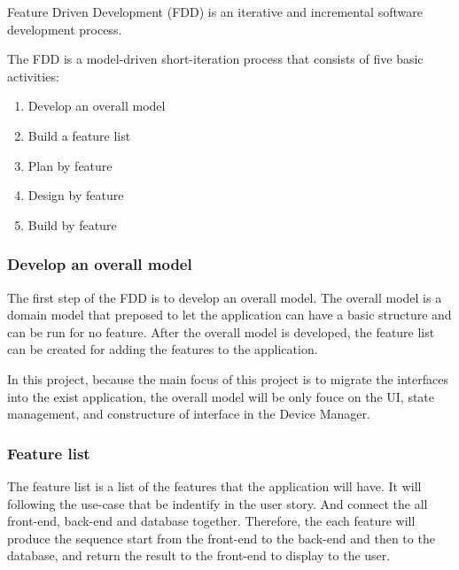 Feature Driven Development (FDD) 
is an iterative and incremental software development process.

The FDD is a model-driven short-iteration process 
that consists of five basic activities:

\begin{enumerate}
    \item Develop an overall model
    \item Build a feature list
    \item Plan by feature
    \item Design by feature
    \item Build by feature
\end{enumerate}

\subsubsection{Develop an overall model}
The first step of the FDD is to develop an overall model. 
The overall model is a domain model that preposed to let the application
can have a basic structure and can be run for no feature.
After the overall model is developed, 
the feature list can be created for adding the features to the application.

In this project, because the main focus of this project is to migrate
the interfaces into the exist application, the overall model will be only 
fouce on the UI, state management, and constructure of interface
in the Device Manager.

\subsubsection{Feature list}
The feature list is a list of the features that the application will have.
It will following the use-case that be indentify in the user story. 
And connect the all front-end, back-end and database together.
Therefore, the each feature will produce the sequence start 
from the front-end to the back-end and then to the database, 
and return the result to the front-end to display to the user.